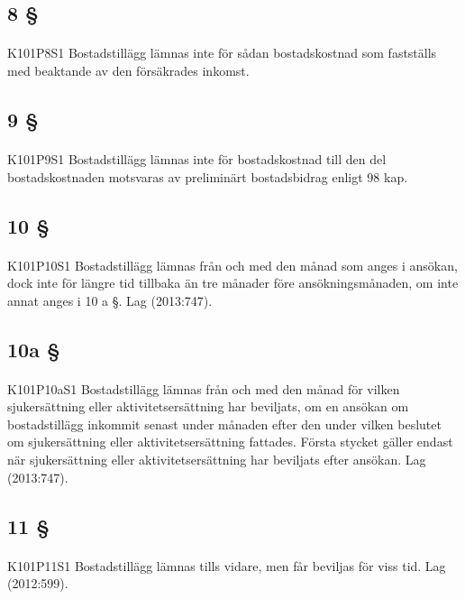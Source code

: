 \documentclass[a4paper,notitlepage,openany,10pt]{book}
\begin{document}
\subsection*{8 §}
\paragraph*{}
{\tiny K101P8S1}
Bostadstillägg lämnas inte för sådan bostadskostnad som fastställs med beaktande av den försäkrades inkomst.
\subsection*{9 §}
\paragraph*{}
{\tiny K101P9S1}
Bostadstillägg lämnas inte för bostadskostnad till den del bostadskostnaden motsvaras av preliminärt bostadsbidrag enligt 98 kap.
\subsection*{10 §}
\paragraph*{}
{\tiny K101P10S1}
Bostadstillägg lämnas från och med den månad som anges i ansökan, dock inte för längre tid tillbaka än tre månader före ansökningsmånaden, om inte annat anges i 10 a §.
Lag (2013:747).
\subsection*{10a §}
\paragraph*{}
{\tiny K101P10aS1}
Bostadstillägg lämnas från och med den månad för vilken sjukersättning eller aktivitetsersättning har beviljats, om en ansökan om bostadstillägg inkommit senast under månaden efter den under vilken beslutet om sjukersättning eller aktivitetsersättning fattades.
Första stycket gäller endast när sjukersättning eller aktivitetsersättning har beviljats efter ansökan.
Lag (2013:747).
\subsection*{11 §}
\paragraph*{}
{\tiny K101P11S1}
Bostadstillägg lämnas tills vidare, men får beviljas för viss tid.
Lag (2012:599).
\end{document}
